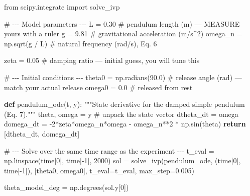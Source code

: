 \documentclass[
  12pt,
  letterpaper,
]{article}
\newenvironment{Shaded}{\begin{snugshade}}{\end{snugshade}}
\newcommand{\CommentTok}[1]{\textcolor[rgb]{0.37,0.37,0.37}{#1}}
\newcommand{\ControlFlowTok}[1]{\textcolor[rgb]{0.00,0.23,0.31}{\textbf{#1}}}
\newcommand{\DecValTok}[1]{\textcolor[rgb]{0.68,0.00,0.00}{#1}}
\newcommand{\FloatTok}[1]{\textcolor[rgb]{0.68,0.00,0.00}{#1}}
\newcommand{\ImportTok}[1]{\textcolor[rgb]{0.00,0.46,0.62}{#1}}
\newcommand{\KeywordTok}[1]{\textcolor[rgb]{0.00,0.23,0.31}{\textbf{#1}}}
\newcommand{\NormalTok}[1]{\textcolor[rgb]{0.00,0.23,0.31}{#1}}
\newcommand{\OperatorTok}[1]{\textcolor[rgb]{0.37,0.37,0.37}{#1}}
\begin{document}
\begin{Shaded}
\begin{Highlighting}[]
\ImportTok{from}\NormalTok{ scipy.integrate }\ImportTok{import}\NormalTok{ solve\_ivp}

\CommentTok{\# {-}{-}{-} Model parameters {-}{-}{-}}
\NormalTok{L   }\OperatorTok{=} \FloatTok{0.30}                  \CommentTok{\# pendulum length (m) — MEASURE yours with a ruler}
\NormalTok{g   }\OperatorTok{=} \FloatTok{9.81}                  \CommentTok{\# gravitational acceleration (m/s\^{}2)}
\NormalTok{omega\_n }\OperatorTok{=}\NormalTok{ np.sqrt(g }\OperatorTok{/}\NormalTok{ L)    }\CommentTok{\# natural frequency (rad/s), Eq. 6}

\NormalTok{zeta }\OperatorTok{=} \FloatTok{0.05}                 \CommentTok{\# damping ratio — initial guess, you will tune this}

\CommentTok{\# {-}{-}{-} Initial conditions {-}{-}{-}}
\NormalTok{theta0 }\OperatorTok{=}\NormalTok{ np.radians(}\FloatTok{90.0}\NormalTok{)   }\CommentTok{\# release angle (rad) — match your actual release}
\NormalTok{omega0 }\OperatorTok{=} \FloatTok{0.0}                \CommentTok{\# released from rest}

\KeywordTok{def}\NormalTok{ pendulum\_ode(t, y):}
    \CommentTok{"""State derivative for the damped simple pendulum (Eq. 7)."""}
\NormalTok{    theta, omega }\OperatorTok{=}\NormalTok{ y                       }\CommentTok{\# unpack the state vector}
\NormalTok{    dtheta\_dt }\OperatorTok{=}\NormalTok{ omega}
\NormalTok{    domega\_dt }\OperatorTok{=} \OperatorTok{{-}}\DecValTok{2}\OperatorTok{*}\NormalTok{zeta}\OperatorTok{*}\NormalTok{omega\_n}\OperatorTok{*}\NormalTok{omega }\OperatorTok{{-}}\NormalTok{ omega\_n}\OperatorTok{**}\DecValTok{2} \OperatorTok{*}\NormalTok{ np.sin(theta)}
    \ControlFlowTok{return}\NormalTok{ [dtheta\_dt, domega\_dt]}

\CommentTok{\# {-}{-}{-} Solve over the same time range as the experiment {-}{-}{-}}
\NormalTok{t\_eval }\OperatorTok{=}\NormalTok{ np.linspace(time[}\DecValTok{0}\NormalTok{], time[}\OperatorTok{{-}}\DecValTok{1}\NormalTok{], }\DecValTok{2000}\NormalTok{)}
\NormalTok{sol }\OperatorTok{=}\NormalTok{ solve\_ivp(pendulum\_ode, (time[}\DecValTok{0}\NormalTok{], time[}\OperatorTok{{-}}\DecValTok{1}\NormalTok{]), [theta0, omega0],}
\NormalTok{                t\_eval}\OperatorTok{=}\NormalTok{t\_eval, max\_step}\OperatorTok{=}\FloatTok{0.005}\NormalTok{)}

\NormalTok{theta\_model\_deg }\OperatorTok{=}\NormalTok{ np.degrees(sol.y[}\DecValTok{0}\NormalTok{])}
\end{Highlighting}
\end{Shaded}
\end{document}
